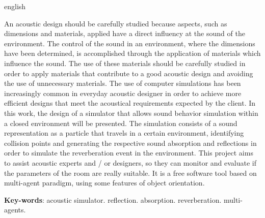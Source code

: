 \begin{resumo}[Abstract]
 \begin{otherlanguage*}{english}

An acoustic design should be carefully studied because aspects, such as dimensions and materials, applied have a direct influency at the sound of the environment. The control of the sound in an environment, where the dimensions have been determined, is accomplished through the application of materials which influence the sound. The use of these materials should be carefully studied in order to apply materials that contribute to a good acoustic design and avoiding the use of unnecessary materials. The use of computer simulations has been increasingly common in everyday acoustic designer in order to achieve more efficient designs that meet the acoustical requirements expected by the client. In this work, the design of a simulator that allows sound behavior simulation within a closed environment will be presented. The simulation consists of a sound representation as a particle that travels in a certain environment, identifying collision points and generating the respective sound absorption and reflections in order to simulate the reverberation event in the environment. This project aims to assist acoustic experts and / or designers, so they can monitor and evaluate if the parameters of the room are really suitable. It is a free software tool based on multi-agent paradigm, using some features of object orientation.

   \vspace{\onelineskip}
 
   \noindent 
   \textbf{Key-words}: acoustic simulator. reflection. absorption. reverberation. multi-agents. 
 \end{otherlanguage*}
\end{resumo}
